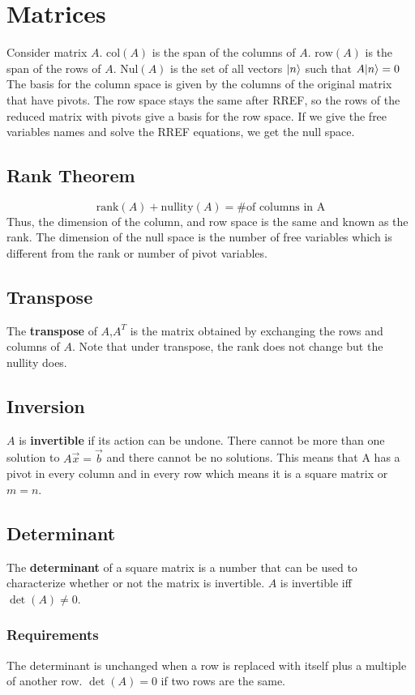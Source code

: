 \documentclass[../main.tex]{subfiles}
\DeclarePairedDelimiter\ket{\lvert}{\rangle}
\begin{document}
\section{Matrices}
Consider matrix $A$. $\text{col}(A)$ is the span of the columns of $A$. $\text{row}(A)$ is the span of
the rows of $A$. $\text{Nul}(A)$ is the set of all vectors $\ket{n}$ such that $A\ket{n}=0$
The basis for the column space is given by the columns of the original matrix that have pivots.
The row space stays the same after RREF, so the rows of the reduced matrix with pivots give a basis for the row space.
If we give the free variables names and solve the RREF equations, we get the null space.

\subsection{Rank Theorem}
$$\text{rank}(A)+\text{nullity}(A)=\text{\# of columns in A}$$
Thus, the dimension of the column, and row space is the same and known as the rank. The dimension of the null
space is the number of free variables which is different from the rank or number of pivot variables.

\subsection{Transpose}
The \textbf{transpose} of $A$,$A^{T}$ is the matrix obtained by exchanging the rows and columns of $A$.
Note that under transpose, the rank does not change but the nullity does.

\subsection{Inversion}
$A$ is \textbf{invertible} if its action can be undone. There cannot be more than one
solution to $A\vec{x}=\vec{b}$ and there cannot be no solutions. This means that A has a
pivot in every column and in every row which means it is a square matrix or $m=n$.

\subsection{Determinant}
The \textbf{determinant} of a square matrix is a number that can be used to characterize
whether or not the matrix is invertible. $A$ is invertible iff $\det(A)\neq 0$.
\subsubsection{Requirements}
The determinant is unchanged when a row is replaced with itself plus a multiple of another row.
$\det(A)=0$ if two rows are the same.
\end{document}
